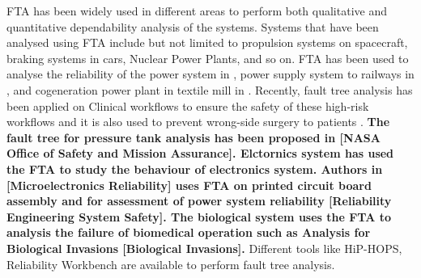 \documentclass[10pt]{llncs}
\begin{document}
			
%

FTA has been widely used in different areas to perform both qualitative and quantitative dependability analysis of the systems. Systems that have been analysed using FTA include but not limited to propulsion systems on spacecraft, braking systems in cars, Nuclear Power Plants, and so on. FTA has been used to analyse the reliability of the power system in  \cite{volkanovski2009}, power supply system to railways in  \cite{Chen2007}, and cogeneration power plant in textile mill in \cite{Ramesh2011}.  Recently, fault tree analysis has been applied on Clinical workflows to ensure the safety of these high-risk workflows \cite{lamis2014} and it is also used to prevent wrong-side surgery to patients \cite{abecassis2015}. \textbf{The fault tree for pressure tank analysis has been proposed in [NASA Office of Safety and Mission Assurance].
Elctornics system has used the FTA to study the behaviour of electronics system. Authors in [Microelectronics Reliability] uses FTA on printed circuit board assembly and 
for assessment of power system reliability [Reliability Engineering  System Safety]. The biological system uses the FTA to analysis the failure of biomedical operation such as Analysis for Biological Invasions  [Biological Invasions].} Different tools like HiP-HOPS\cite{Papadopoulos2012}, Reliability Workbench\cite{Isograph2014}  are available to perform fault tree analysis.
 
\end{document}
